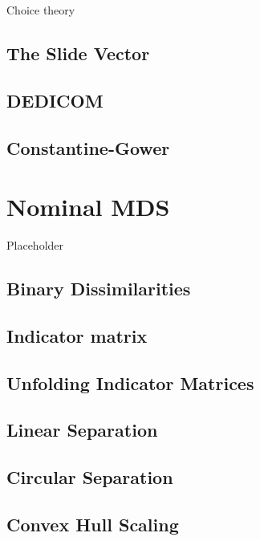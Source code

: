 \documentclass[
  12pt,
]{book}
\begin{document}
Choice theory

\section{The Slide Vector}\label{the-slide-vector}

\section{DEDICOM}\label{dedicom}

\section{Constantine-Gower}\label{constantine-gower}

\chapter{Nominal MDS}\label{chnominal}

Placeholder

\section{Binary Dissimilarities}\label{binary-dissimilarities}

\section{Indicator matrix}\label{indicator-matrix}

\section{Unfolding Indicator Matrices}\label{unfolding-indicator-matrices}

\section{Linear Separation}\label{linear-separation}

\section{Circular Separation}\label{circular-separation}

\section{Convex Hull Scaling}\label{convex-hull-scaling}
\end{document}
